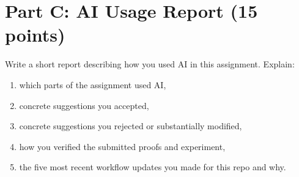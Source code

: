 \documentclass{article}
\begin{document}
\section{Part C: AI Usage Report (15 points)}

Write a short report describing how you used AI in this assignment. Explain:
\begin{enumerate}
\item which parts of the assignment used AI,
\item concrete suggestions you accepted,
\item concrete suggestions you rejected or substantially modified,
\item how you verified the submitted proofs and experiment,
\item the five most recent workflow updates you made for this repo and why.
\end{enumerate}
\end{document}
